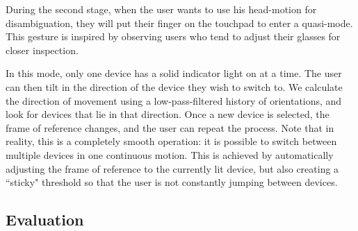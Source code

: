 During the second stage, when the user wants to use his head-motion for disambiguation, they will put their finger on the touchpad to enter a quasi-mode.  This gesture is inspired by observing users who tend to adjust their glasses for closer inspection.

In this mode, only one device has a solid indicator light on at a time.   The user can then tilt in the direction of the device they wish to switch to. We calculate the direction of movement using a low-pass-filtered history of orientations, and look for devices that lie in that direction. Once a new device is selected, the frame of reference changes, and the user can repeat the process. Note that in reality, this is a completely smooth operation: it is possible to switch between multiple devices in one continuous motion. This is achieved by automatically adjusting the frame of reference to the currently lit device, but also creating a ``sticky" threshold so that the user is not constantly jumping between devices. 




\subsection{Evaluation}



